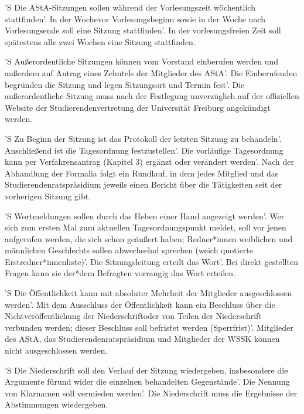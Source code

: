 \documentclass[fontsize=12pt,parskip=half, ref=short]{scrartcl}
\begin{document}
\begin{contract}
  'S Die AStA-Sitzungen sollen während der Vorlesungszeit wöchentlich
  stattfinden'. In der Wochevor Vorlesungsbeginn sowie in der Woche nach
  Vorlesungsende soll eine Sitzung stattfinden'. In der vorlesungsfreien Zeit
  soll spätestens alle zwei Wochen eine Sitzung stattfinden.

  'S Außerordentliche Sitzungen können vom Vorstand einberufen werden und
  außerdem auf Antrag eines Zehntels der Mitglieder des AStA'. Die Einberufenden
  begründen die Sitzung und legen Sitzungsort und Termin fest'. Die
  außerordentliche Sitzung muss nach der Festlegung unverzüglich auf der
  offiziellen Website der Studierendenvertretung der Universität Freiburg
  angekündigt werden.

  'S Zu Beginn der Sitzung ist das Protokoll der letzten Sitzung zu behandeln'.
  Anschließend ist die Tagesordnung festzustellen'. Die vorläufige Tagesordnung
  kann per Verfahrensantrag (Kapitel 3) ergänzt oder verändert werden'. Nach der
  Abhandlung der Formalia folgt ein Rundlauf, in dem jedes Mitglied und das
  Studierendenratspräsidium jeweils einen Bericht über die Tätigkeiten seit der
  vorherigen Sitzung gibt.

  'S \label{Par:Sitz.Wortmel} Wortmeldungen sollen durch das Heben einer Hand angezeigt werden'. Wer sich
  zum ersten Mal zum aktuellen Tagesordnungspunkt meldet, soll vor jenen
  aufgerufen werden, die sich schon geäußert haben; Redner*innen weiblichen und
  männlichen Geschlechts sollen abwechselnd sprechen (weich quotierte
  Erstredner*innenliste)'. Die Sitzungsleitung erteilt das Wort'. Bei direkt
  gestellten Fragen kann sie der*dem Befragten vorrangig das Wort erteilen.

  'S Die Öffentlichkeit kann mit absoluter Mehrheit der Mitglieder
  ausgeschlossen werden'.
  \label{Par:Sitz.Sperr}Mit dem Ausschluss der Öffentlichkeit kann ein
  Beschluss über die Nichtveröffentlichung der Niederschriftoder von Teilen der
  Niederschrift verbunden werden; dieser Beschluss soll befristet werden
  (Sperrfrist)'. Mitglieder des AStA, das Studierendenratspräsidium und
  Mitglieder der WSSK können nicht ausgeschlossen werden.

  \label{Par:Nieders}
  'S Die Niederschrift soll den Verlauf der Sitzung wiedergeben, insbesondere
  die Argumente fürund wider die einzelnen behandelten Gegenstände'. Die Nennung
  von Klarnamen soll vermieden werden'. Die Niederschrift muss die Ergebnisse
  der Abstimmungen wiedergeben.


\end{contract}
\end{document}
